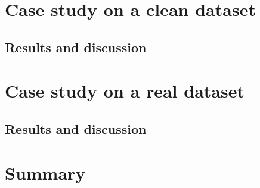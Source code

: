 \section{Case study on a clean dataset}
\subsection{Results and discussion}

\section{Case study on a real dataset}
\subsection{Results and discussion}

\section{Summary}



